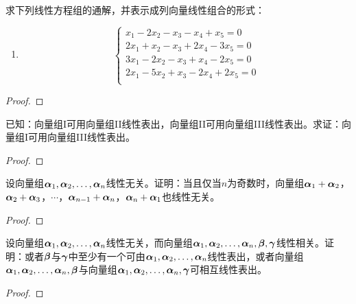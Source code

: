 \begin{problem}
求下列线性方程组的通解，并表示成列向量线性组合的形式：
\begin{enumerate}
    \item
          {
          \begin{equation*}
              \begin{cases}
                  x_1-2x_2-x_3-x_4+x_5=0    \\
                  2x_1+x_2-x_3+2x_4-3x_5=0  \\
                  3x_1-2x_2-x_3+x_4-2x_5=0  \\
                  2x_1-5x_2+x_3-2x_4+2x_5=0 \\
              \end{cases}
          \end{equation*}
          }
\end{enumerate}
\end{problem}
\begin{proof}

\end{proof}

\begin{problem}
已知：向量组I可用向量组II线性表出，向量组II可用向量组III线性表出。求证：向量组I可用向量组III线性表出。
\end{problem}
\begin{proof}

\end{proof}

\begin{problem}
设向量组\(\enums{\vecal}{n}\)线性无关。证明：当且仅当\(n\)为奇数时，向量组\(\vecal_1+\vecal_2\)，\(\vecal_2+\vecal_3\)，\(\cdots\)，\(\vecal_{n-1}+\vecal_n\)，\(\vecal_n+\vecal_1\)也线性无关。
\end{problem}
\begin{proof}

\end{proof}

\begin{problem}
设向量组\(\enums{\vecal}{n}\)线性无关，而向量组\(\enums{\vecal}{n},\vecbeta,\vecgamma\)线性相关。证明：或者\(\vecbeta\)与\(\vecgamma\)中至少有一个可由\(\enums{\vecal}{n}\)线性表出，或者向量组\(\enums{\vecal}{n},\vecbeta\)与向量组\(\enums{\vecal}{n},\vecgamma\)可相互线性表出。
\end{problem}
\begin{proof}

\end{proof}

